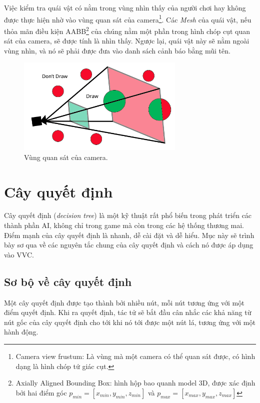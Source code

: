 \documentclass[12pt]{report}
\newcommand{\project}{VVC}
\begin{document}
Việc kiểm tra quái vật có nằm trong vùng nhìn thấy của người chơi hay không được thực hiện nhờ vào vùng quan sát của camera\footnote{Camera view frustum: Là vùng mà một camera có thể quan sát được, có hình dạng là hình chóp tứ giác cụt.}. Các \textit{Mesh} của quái vật, nếu thỏa mãn điều kiện AABB\footnote{Axially Aligned Bounding Box: hình hộp bao quanh model 3D, được xác định bởi hai điểm góc $p_{min} = [x_{min}, y_{min}, z_{min}]$ và $p_{max} = [x_{max}, y_{max}, z_{max}]$} của chúng nằm một phần trong hình chóp cụt quan sát của camera, sẽ được tính là nhìn thấy. Ngược lại, quái vật này sẽ nằm ngoài vùng nhìn, và nó sẽ phải được đưa vào danh sách cảnh báo bằng mũi tên.
\begin{figure}[H]
  \centering
    \includegraphics[width=8cm]{Pics/Chap5/camerafrustum.png}
  \caption{Vùng quan sát của camera.}
\end{figure}

\section{Cây quyết định}
\label{sec:decisiontree}
Cây quyết định (\textit{decision tree}) là một kỹ thuật rất phổ biến trong phát triển các thành phần AI, không chỉ trong game mà còn trong các hệ thống thương mai. Điểm mạnh của cây quyết định là nhanh, dễ cài đặt và dễ hiểu\cite{aiforgames}. Mục này sẽ trình bày sơ qua về các nguyên tắc chung của cây quyết định và cách nó được áp dụng vào \project.

\subsection{Sơ bộ về cây quyết định}
Một cây quyết định được tạo thành bởi nhiều nút, mỗi nút tương ứng với một điểm quyết định. Khi ra quyết định, tác tử sẽ bắt đầu cân nhắc các khả năng từ nút gốc của cây quyết định cho tới khi nó tới được một nút lá, tương ứng với một hành động.
\end{document}
